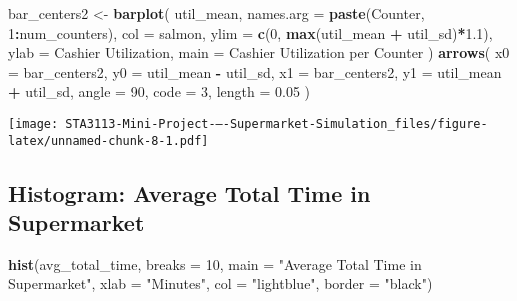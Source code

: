 \documentclass[
]{article}
\newenvironment{Shaded}{\begin{snugshade}}{\end{snugshade}}
\newcommand{\AttributeTok}[1]{\textcolor[rgb]{0.13,0.29,0.53}{#1}}
\newcommand{\DecValTok}[1]{\textcolor[rgb]{0.00,0.00,0.81}{#1}}
\newcommand{\FloatTok}[1]{\textcolor[rgb]{0.00,0.00,0.81}{#1}}
\newcommand{\FunctionTok}[1]{\textcolor[rgb]{0.13,0.29,0.53}{\textbf{#1}}}
\newcommand{\NormalTok}[1]{#1}
\newcommand{\OtherTok}[1]{\textcolor[rgb]{0.56,0.35,0.01}{#1}}
\newcommand{\SpecialCharTok}[1]{\textcolor[rgb]{0.81,0.36,0.00}{\textbf{#1}}}
\newcommand{\StringTok}[1]{\textcolor[rgb]{0.31,0.60,0.02}{#1}}
\begin{document}
\begin{Shaded}
\begin{Highlighting}[]
\NormalTok{bar\_centers2 }\OtherTok{\textless{}{-}} \FunctionTok{barplot}\NormalTok{(}
\NormalTok{util\_mean,}
\AttributeTok{names.arg =} \FunctionTok{paste}\NormalTok{(}\StringTok{\textquotesingle{}Counter\textquotesingle{}}\NormalTok{, }\DecValTok{1}\SpecialCharTok{:}\NormalTok{num\_counters),}
\AttributeTok{col =} \StringTok{\textquotesingle{}salmon\textquotesingle{}}\NormalTok{,}
\AttributeTok{ylim =} \FunctionTok{c}\NormalTok{(}\DecValTok{0}\NormalTok{, }\FunctionTok{max}\NormalTok{(util\_mean }\SpecialCharTok{+}\NormalTok{ util\_sd)}\SpecialCharTok{*}\FloatTok{1.1}\NormalTok{),}
\AttributeTok{ylab =} \StringTok{\textquotesingle{}Cashier Utilization\textquotesingle{}}\NormalTok{,}
\AttributeTok{main =} \StringTok{\textquotesingle{}Cashier Utilization per Counter\textquotesingle{}}
\NormalTok{)}
\FunctionTok{arrows}\NormalTok{(}
\AttributeTok{x0 =}\NormalTok{ bar\_centers2,}
\AttributeTok{y0 =}\NormalTok{ util\_mean }\SpecialCharTok{{-}}\NormalTok{ util\_sd,}
\AttributeTok{x1 =}\NormalTok{ bar\_centers2,}
\AttributeTok{y1 =}\NormalTok{ util\_mean }\SpecialCharTok{+}\NormalTok{ util\_sd,}
\AttributeTok{angle =} \DecValTok{90}\NormalTok{, }\AttributeTok{code =} \DecValTok{3}\NormalTok{, }\AttributeTok{length =} \FloatTok{0.05}
\NormalTok{)}
\end{Highlighting}
\end{Shaded}

\texttt{[image: STA3113-Mini-Project-–-Supermarket-Simulation\_files/figure-latex/unnamed-chunk-8-1.pdf]}

\newpage
\justifying

\subsection{Histogram: Average Total Time in
Supermarket}\label{histogram-average-total-time-in-supermarket}

\begin{Shaded}
\begin{Highlighting}[]
\FunctionTok{hist}\NormalTok{(avg\_total\_time,}
\AttributeTok{breaks =} \DecValTok{10}\NormalTok{,}
\AttributeTok{main =} \StringTok{"Average Total Time in Supermarket"}\NormalTok{,}
\AttributeTok{xlab =} \StringTok{"Minutes"}\NormalTok{,}
\AttributeTok{col =} \StringTok{"lightblue"}\NormalTok{,}
\AttributeTok{border =} \StringTok{"black"}\NormalTok{)}
\end{Highlighting}
\end{Shaded}
\end{document}
